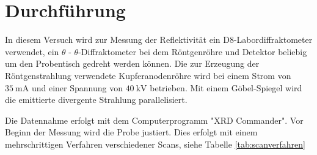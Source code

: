 \section{Durchführung}
In diesem Versuch wird zur Messung der Reflektivität ein D8-Labordiffraktometer verwendet, ein 
$\theta$ - $\theta$-Diffraktometer bei dem Röntgenröhre und Detektor beliebig um den Probentisch 
gedreht werden können. Die zur Erzeugung der Röntgenstrahlung verwendete Kupferanodenröhre wird bei einem
Strom von $\SI{35}{\mA}$ und einer Spannung von $\SI{40}{\kV}$ betrieben. Mit einem Göbel-Spiegel 
wird die emittierte divergente Strahlung parallelisiert. %

Die Datennahme erfolgt mit dem Computerprogramm "XRD Commander". 
Vor Beginn der Messung wird die Probe justiert. Dies erfolgt mit einem mehrschrittigen Verfahren 
verschiedener Scans, siehe Tabelle \ref{tab:scanverfahren}